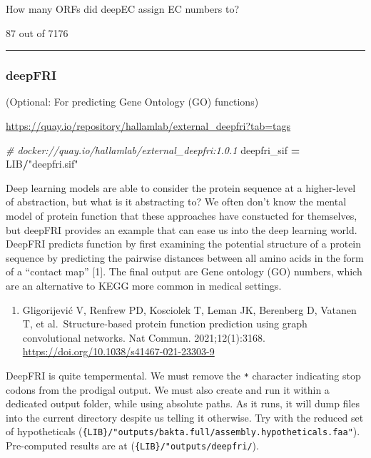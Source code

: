 \documentclass[
]{book}
\newenvironment{Shaded}{\begin{snugshade}}{\end{snugshade}}
\newcommand{\CommentTok}[1]{\textcolor[rgb]{0.56,0.35,0.01}{\textit{#1}}}
\newcommand{\NormalTok}[1]{#1}
\newcommand{\OperatorTok}[1]{\textcolor[rgb]{0.81,0.36,0.00}{\textbf{#1}}}
\newcommand{\StringTok}[1]{\textcolor[rgb]{0.31,0.60,0.02}{#1}}
\providecommand{\tightlist}{%
  \setlength{\itemsep}{0pt}\setlength{\parskip}{0pt}}
\begin{document}
How many ORFs did deepEC assign EC numbers to?

87 out of 7176

\begin{center}\rule{0.5\linewidth}{0.5pt}\end{center}

\subsubsection{deepFRI}\label{deepfri}

(Optional: For predicting Gene Ontology (GO) functions)

\url{https://quay.io/repository/hallamlab/external_deepfri?tab=tags}

\begin{Shaded}
\begin{Highlighting}[numbers=left,,]
\CommentTok{\# docker://quay.io/hallamlab/external\_deepfri:1.0.1}
\NormalTok{deepfri\_sif }\OperatorTok{=}\NormalTok{ LIB}\OperatorTok{/}\StringTok{"deepfri.sif"}
\end{Highlighting}
\end{Shaded}

Deep learning models are able to consider the protein sequence at a higher-level of abstraction, but what is it abstracting to?
We often don't know the mental model of protein function that these approaches have constucted for themselves, but deepFRI provides
an example that can ease us into the deep learning world. DeepFRI predicts function by first examining the potential structure
of a protein sequence by predicting the pairwise distances between all amino acids in the form of a ``contact map'' {[}1{]}. The final output
are Gene ontology (GO) numbers, which are an alternative to KEGG more common in medical settings.

\begin{enumerate}
\def\labelenumi{\arabic{enumi}.}
\tightlist
\item
  Gligorijević V, Renfrew PD, Kosciolek T, Leman JK, Berenberg D, Vatanen T, et al.~Structure-based protein function prediction using graph convolutional networks. Nat Commun. 2021;12(1):3168. \url{https://doi.org/10.1038/s41467-021-23303-9}
\end{enumerate}

DeepFRI is quite tempermental. We must remove the \texttt{*} character indicating stop codons from the prodigal output.
We must also create and run it within a dedicated output folder, while using absolute paths.
As it runs, it will dump files into the current directory despite us telling it otherwise.
Try with the reduced set of hypotheticals (\texttt{\{LIB\}/"outputs/bakta.full/assembly.hypotheticals.faa"}).
Pre-computed results are at (\texttt{\{LIB\}/"outputs/deepfri/}).
\end{document}
